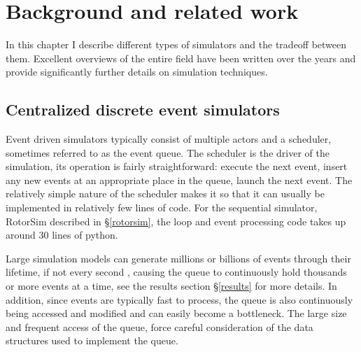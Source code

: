 \chapter{Background and related work} \label{background}

In this chapter I describe different types of simulators and the tradeoff between them.
Excellent overviews of the entire field have been written over the years \cite{fujimoto_parallel_2001} \cite{fujimoto_computational_2017} and provide significantly further details on simulation techniques.

\section{Centralized discrete event simulators} \label{centralized-sim}

Event driven simulators typically consist of multiple actors and a scheduler, sometimes referred to as the event queue.
The scheduler is the driver of the simulation, its operation is fairly straightforward: execute the next event, insert any new events at an appropriate place in the queue, launch the next event.
The relatively simple nature of the scheduler makes it so that it can usually be implemented in relatively few lines of code.
For the sequential simulator, RotorSim\cite{brode-roger_nibriviarotorsim_2020} described in \S \ref{rotorsim}, the loop and event processing code takes up around 30 lines of python.

Large simulation models can generate millions or billions of events through their lifetime, if not every second \cite{fujimoto_parallel_2015}, causing the queue to continuously hold thousands or more events at a time, see the results section \S\ref{results} for more details.
In addition, since events are typically fast to process, the queue is also continuously being accessed and modified and can easily become a bottleneck.
The large size and frequent access of the queue, force careful consideration of the data structures used to implement the queue.

